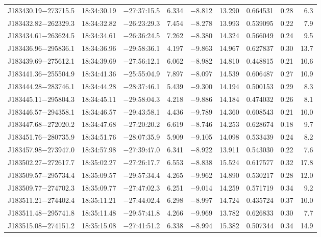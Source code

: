 \begin{table*}
\begin{tabular}{lcccccccr}
J183430.19$-$273715.5 & 18:34:30.19 & $-$27:37:15.5 &  6.334 & $-$8.812 & 13.290 & 0.664531 & 0.28 & 6.3 \\
J183432.82$-$262329.3 & 18:34:32.82 & $-$26:23:29.3 &  7.454 & $-$8.278 & 13.993 & 0.539095 & 0.22 & 7.9 \\
J183434.61$-$263624.5 & 18:34:34.61 & $-$26:36:24.5 &  7.262 & $-$8.380 & 14.324 & 0.566049 & 0.24 & 9.5 \\
J183436.96$-$295836.1 & 18:34:36.96 & $-$29:58:36.1 &  4.197 & $-$9.863 & 14.967 & 0.627837 & 0.30 & 13.7 \\
J183439.69$-$275612.1 & 18:34:39.69 & $-$27:56:12.1 &  6.062 & $-$8.982 & 14.810 & 0.448815 & 0.21 & 10.6 \\
J183441.36$-$255504.9 & 18:34:41.36 & $-$25:55:04.9 &  7.897 & $-$8.097 & 14.539 & 0.606487 & 0.27 & 10.9 \\
J183444.28$-$283746.1 & 18:34:44.28 & $-$28:37:46.1 &  5.439 & $-$9.300 & 14.194 & 0.500153 & 0.29 & 8.3 \\
J183445.11$-$295804.3 & 18:34:45.11 & $-$29:58:04.3 &  4.218 & $-$9.886 & 14.184 & 0.474032 & 0.26 & 8.1 \\
J183446.57$-$294358.1 & 18:34:46.57 & $-$29:43:58.1 &  4.436 & $-$9.789 & 14.360 & 0.608543 & 0.21 & 10.0 \\
J183447.68$-$272020.2 & 18:34:47.68 & $-$27:20:20.2 &  6.619 & $-$8.746 & 14.253 & 0.628674 & 0.18 & 9.7 \\
J183451.76$-$280735.9 & 18:34:51.76 & $-$28:07:35.9 &  5.909 & $-$9.105 & 14.098 & 0.533439 & 0.24 & 8.2 \\
J183457.98$-$273947.0 & 18:34:57.98 & $-$27:39:47.0 &  6.341 & $-$8.922 & 13.911 & 0.543030 & 0.22 & 7.6 \\
J183502.27$-$272617.7 & 18:35:02.27 & $-$27:26:17.7 &  6.553 & $-$8.838 & 15.524 & 0.617577 & 0.32 & 17.8 \\
J183509.57$-$295734.4 & 18:35:09.57 & $-$29:57:34.4 &  4.265 & $-$9.962 & 14.890 & 0.530217 & 0.28 & 12.0 \\
J183509.77$-$274702.3 & 18:35:09.77 & $-$27:47:02.3 &  6.251 & $-$9.014 & 14.259 & 0.571719 & 0.34 & 9.2 \\
J183511.21$-$274402.4 & 18:35:11.21 & $-$27:44:02.4 &  6.298 & $-$8.997 & 14.724 & 0.435724 & 0.37 & 10.0 \\
J183511.48$-$295741.8 & 18:35:11.48 & $-$29:57:41.8 &  4.266 & $-$9.969 & 13.782 & 0.626833 & 0.30 & 7.7 \\
J183515.08$-$274151.2 & 18:35:15.08 & $-$27:41:51.2 &  6.338 & $-$8.994 & 15.382 & 0.507344 & 0.34 & 14.9 \\

\end{tabular}
\end{table*}

